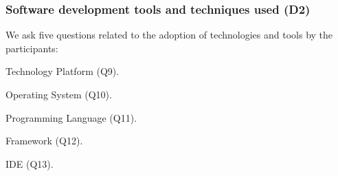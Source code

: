 \subsubsection{Software development tools and techniques used (D2)}
\label{tools}
We ask five questions related to the adoption of technologies and tools by the participants: \begin{inparaenum}
\item Technology Platform (Q9).
\item Operating System (Q10).
\item Programming Language (Q11).
\item Framework (Q12).
\item IDE (Q13).
\end{inparaenum}

